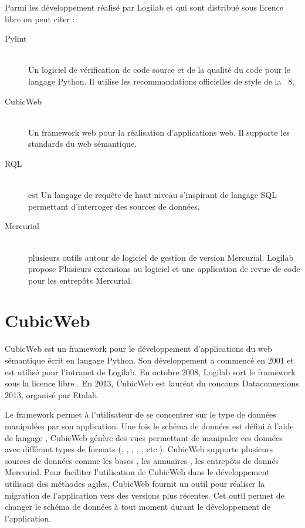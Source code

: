 Parmi les développement réalisé par Logilab et qui sont distribué sous licence libre on peut citer :
\begin{description}
\item[Pylint]\hfill\\ Un logiciel de vérification de code source et de la qualité du code pour le langage Python. Il utilise les recommandations officielles de style de la  ~8.
\item[CubicWeb]\hfill\\ Un framework web pour la réalisation d’applications web. Il supporte les standards du web sémantique.
\item[RQL]\hfill\\  est Un langage de requête de haut niveau s’inspirant de langage SQL permettant d'interroger des sources de données.
\item[Mercurial] \hfill\\ plusieurs outils autour de logiciel de gestion de version Mercurial. Logilab propose Plusieurs extensions au logiciel et une application de revue de code pour les entrepôts Mercurial. 
\end{description}



\section{CubicWeb}
CubicWeb est un framework pour le développement d'applications du web sémantique écrit en langage Python. Son développement a commencé en 2001 et est utilisé pour l'intranet de Logilab. En octobre 2008, Logilab sort le framework sous la licence libre . En 2013, CubicWeb est lauréat du concours Dataconnexions 2013, organisé par Etalab\cite{etalab}.

Le framework permet à l'utilisateur de se concentrer sur le type de données manipulées par son application. Une fois le schéma de données est défini à l'aide de langage , CubicWeb génère des vues permettant de manipuler ces données avec différant types de formats (, , , , , etc.). CubicWeb supporte plusieurs sources de données comme les bases , les annuaires , les entrepôts de donnés Mercurial. Pour faciliter l'utilisation de CubicWeb dans le développement utilisant des méthodes agiles, CubicWeb fournit un outil pour réaliser la migration de l'application vers des versions plus récentes. Cet outil permet de changer le schéma de données à tout moment durant le développement de l'application.


